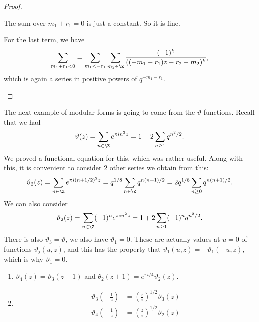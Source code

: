 \documentclass[a4paper]{article}
\begin{document}
\begin{proof}
\begin{enumerate}
      The sum over $m_1 + r_1 = 0$ is just a constant. So it is fine.

      For the last term, we have
      \[
        \sum_{m_1 + r_1 < 0} = \sum_{m_1 < - r_1} \sum_{m_2 \in \Z} \frac{(-1)^k}{((-m_1 - r_1)z - r_2 - m_2)^k},
      \]
      which is again a series in positive powers of $q^{-m_1 - r_1}$.
  \end{enumerate}
\end{proof}

The next example of modular forms is going to come from the $\vartheta$ functions. Recall that we had
\[
  \vartheta(z) = \sum_{n \in \Z} e^{\pi in^2 z} = 1 + 2 \sum_{n \geq 1} q^{n^2/2}.
\]
We proved a functional equation for this, which was rather useful. Along with this, it is convenient to consider $2$ other series we obtain from this:
\[
  \vartheta_2(z) = \sum_{n \in \Z} e^{\pi i (n + 1/2)^2 z} = q^{1/8} \sum_{n \in \Z} q^{n(n + 1)/2} = 2 q^{1/8} \sum_{n \geq 0} q^{n(n + 1)/2}.
\]
We can also consider
\[
  \vartheta_2(z) = \sum_{n \in \Z} (-1)^n e^{\pi i n^2 z} = 1 + 2 \sum_{n \geq 1} (-1)^n q^{n^2/2}.
\]
There is also $\vartheta_3 = \vartheta$, we also have $\vartheta_1 = 0$. These are actually values at $u = 0$ of functions $\vartheta_j(u, z)$, and this has the property that $\vartheta_1(u, z) = - \vartheta_1(-u, z)$, which is why $\vartheta_1 = 0$.

\begin{thm}\leavevmode
  \begin{enumerate}
    \item $\vartheta_4(z) = \vartheta_3(z \pm 1)$ and $\theta_2(z + 1) = e^{\pi i/4} \vartheta_2(z)$.
    \item
      \begin{align*}
        \vartheta_3\left(-\frac{1}{z}\right) &= \left(\frac{z}{i}\right)^{1/2} \vartheta_3(z)\\
        \vartheta_4 \left(-\frac{1}{z}\right) &= \left(\frac{z}{i}\right)^{1/2} \vartheta_2(z)
      \end{align*}
  \end{enumerate}
\end{thm}
\end{document}
